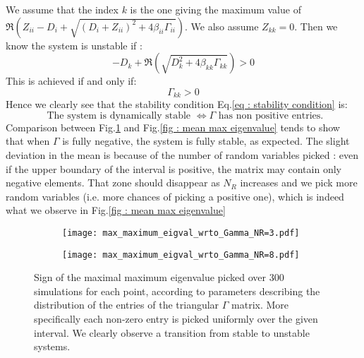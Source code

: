 \documentclass[12pt]{article}
\begin{document}
\begin{appendices}
\begin{equation}
		\end{equation}
		We assume that the index $k$ is the one giving the maximum value of $\Re\left(Z_{ii}-D_i + \sqrt{\left(D_i+Z_{ii}\right)^2 + 4 \beta_{ii} \Gamma_{ii}}\right)$.
		We also assume $Z_{kk}=0$. Then we know the system is unstable if :
		\begin{equation}
			-D_{k}+\Re\left(\sqrt{D_k^2+ 4 \beta_{kk} \Gamma_{kk}}\right) > 0 
		\end{equation}
		This is achieved if and only if:
		\begin{equation}
			\Gamma_{kk} > 0
		\end{equation}
		Hence we clearly see that the stability condition Eq.\eqref{eq : stability condition} is:
		\begin{equation}
			\text{ The system is dynamically stable } \iff \Gamma \text{ has non positive entries.} 
		\end{equation}
		Comparison between Fig.\ref{fig : max max eigenvalue} and Fig.\ref{fig : mean max eigenvalue} tends to show that when $\Gamma$ is fully negative, the system is fully stable, as expected. The slight deviation in the mean is because of the number of random variables picked : even if the upper boundary of the interval is positive, the matrix may contain only negative elements. That zone should disappear as $N_R$ increases and we pick more random variables (i.e. more chances of picking a positive one), which is indeed what we observe in Fig.\ref{fig : mean max eigenvalue}
		\begin{figure}
			\centering
			\begin{subfigure}{0.49\textwidth}
				\texttt{[image: max\_maximum\_eigval\_wrto\_Gamma\_NR=3.pdf]}
			\end{subfigure}
			\hfill
			\begin{subfigure}{0.49\textwidth}
				\texttt{[image: max\_maximum\_eigval\_wrto\_Gamma\_NR=8.pdf]}
			\end{subfigure}
			\caption{Sign of the maximal maximum eigenvalue picked over 300 simulations for each point, according to parameters describing the distribution of the entries of the triangular $\Gamma$ matrix. More specifically each non-zero entry is picked uniformly over the given interval. We clearly observe a transition from stable to unstable systems.} \label{fig : max max eigenvalue}
		\end{figure}
		\begin{figure}
			\centering
			\begin{subfigure}{0.49\textwidth}

\end{subfigure}
\end{figure}
\end{appendices}
\end{document}
